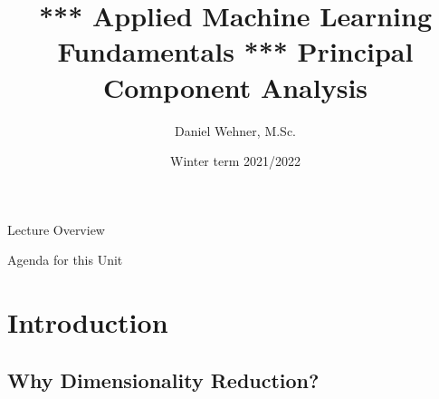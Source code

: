 


\title[Principal Component Analysis]{*** Applied Machine Learning Fundamentals *** Principal Component Analysis}
\author{Daniel Wehner, M.Sc.}
\date{Winter term 2021/2022}




\maketitlepage


\begin{frame}{Lecture Overview}{}
\end{frame}


\begin{frame}{Agenda for this Unit}
	\begin{multicols}{2}
		\tableofcontents
	\end{multicols}
\end{frame}


\section{Introduction}

\subsection{Why Dimensionality Reduction?}

